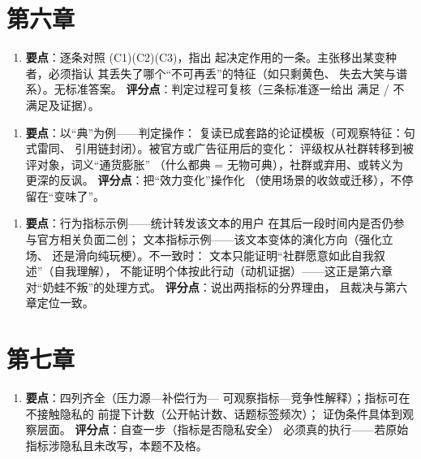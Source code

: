 \section{第六章}\label{app:ans:06}

\begin{enumerate}[label=\textbf{1.},leftmargin=2.6em]
  \item \textbf{要点}：逐条对照 (C1)(C2)(C3)，指出
        起决定作用的一条。主张移出某变种者，必须指认
        其丢失了哪个“不可再丢”的特征（如只剩黄色、
        失去大笑与谱系）。无标准答案。
        \textbf{评分点}：判定过程可复核（三条标准逐一给出
        满足 / 不满足及证据）。
\end{enumerate}

\begin{enumerate}[label=\textbf{2.},leftmargin=2.6em]
  \item \textbf{要点}：以“典”为例——判定操作：
        复读已成套路的论证模板（可观察特征：句式雷同、
        引用链封闭）。被官方或广告征用后的变化：
        评级权从社群转移到被评对象，词义“通货膨胀”
        （什么都典 = 无物可典），社群或弃用、或转义为
        更深的反讽。
        \textbf{评分点}：把“效力变化”操作化
        （使用场景的收敛或迁移），不停留在“变味了”。
\end{enumerate}

\begin{enumerate}[label=\textbf{3.},leftmargin=2.6em]
  \item \textbf{要点}：行为指标示例——统计转发该文本的用户
        在其后一段时间内是否仍参与官方相关负面二创；
        文本指标示例——该文本变体的演化方向（强化立场、
        还是滑向纯玩梗）。不一致时：
        文本只能证明“社群愿意如此自我叙述”（自我理解），
        不能证明个体按此行动（动机证据）——这正是第六章
        对“奶蛙不叛”的处理方式。
        \textbf{评分点}：说出两指标的分界理由，
        且裁决与第六章定位一致。
\end{enumerate}

\section{第七章}\label{app:ans:07}

\begin{enumerate}[label=\textbf{1.},leftmargin=2.6em]
  \item \textbf{要点}：四列齐全（压力源—补偿行为—
        可观察指标—竞争性解释）；指标可在不接触隐私的
        前提下计数（公开帖计数、话题标签频次）；
        证伪条件具体到观察层面。
        \textbf{评分点}：自查一步（指标是否隐私安全）
        必须真的执行——若原始指标涉隐私且未改写，本题不及格。
\end{enumerate}

